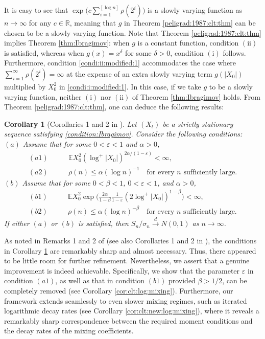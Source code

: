 \documentclass[11pt,a4,leqno]{amsart}
\newtheorem{corollary}[lemma]{Corollary}
\newcommand{\R}{\mathbb{R}}
\newcommand{\vep}{\varepsilon}
\newcommand{\E }{{\mathbb E}}
\newcommand{\1}{{\mathbf 1}}
\begin{document}
It is easy to see that $\exp\big(c\sum_{i=1}^{[\log n]}\rho(2^i)\big)$ is a slowly varying function as $n\to\infty$ 
for any $c\in \R$, meaning that $g$ in Theorem \ref{peligrad:1987:clt:thm} can be chosen to be a slowly varying function. 
Note that Theorem \ref{peligrad:1987:clt:thm} implies Theorem \ref{thm:Ibragimov}: when $g$ is a constant function, 
condition $(\mathrm{ii})$ is satisfied, whereas when $g(x)=x^\delta$ for some $\delta>0$, condition $(\mathrm{i})$ follows. 
Furthermore, condition \eqref{condi:ii:modified:1} accommodates the case where $\sum_{i=1}^\infty \rho(2^i)=\infty$ 
at the expense of an extra slowly varying term $g(|X_0|)$ multiplied by $X^2_0$ in \eqref{condi:i:modified:1}. 
In this case, if we take $g$ to be a slowly varying function, neither $(\mathrm{i})$ nor $(\mathrm{ii})$ 
of Theorem \ref{thm:Ibragimov} holds. From Theorem \ref{peligrad:1987:clt:thm}, one can deduce the following results:

\begin{corollary}[Corollaries 1 and 2 in \cite{peligrad:1987}]
\label{peligrad:1987:clt:cor12}
 Let $(X_t)$ be a strictly stationary sequence satisfying \eqref{condition:Ibragimov}. Consider the following conditions: \\
$(a)$ Assume that for some $0<\vep<1$ and $\alpha>0$, 
\begin{align*}
(a1) \qquad & \E X_0^2 (\log^+ |X_0|)^{2\alpha/(1-\vep)} <\infty, \\
(a2) \qquad & \rho(n) \le \alpha (\log n)^{-1} \quad \text{for every $n$ sufficiently large.}
\end{align*}
$(b)$ Assume that for some $0<\beta <1$, $0<\vep<1$, and $\alpha >0$, 
\begin{align*}
 (b1) \qquad & \E X_0^2 \exp\Big( \frac{2\alpha}{1-\beta}\frac{1}{1-\vep} (2\log^+|X_0|)^{1-\beta} \Big) <\infty, \\ 
 (b2) \qquad & \rho(n) \le \alpha (\log n)^{-\beta} \quad \text{for every $n$ sufficiently large.} 
\end{align*}
If either $(a)$ or $(b)$ is satisfied, then $S_n/\sigma_n\stackrel{d}{\to} N(0,1)$ as $n\to\infty$. 
\end{corollary}

As noted in Remarks 1 and 2 of \cite{peligrad:1987} (see also Corollaries 1 and 2 in \cite{bradley:1987}), 
the conditions in Corollary \ref{peligrad:1987:clt:cor12} are remarkably sharp and almost necessary. 
Thus, there appeared to be little room for further refinement. Nevertheless, we assert that a genuine 
improvement is indeed achievable. Specifically, we show that the parameter $\vep$ in condition $(a1)$, 
as well as that in condition $(b1)$ provided $\beta > 1/2$, can be completely removed (see Corollary \ref{cor:clt:log:mixing}). 
Furthermore, our framework extends seamlessly to even slower mixing regimes, such as iterated logarithmic decay rates 
(see Corollary \ref{cor:clt:new:log:mixing}), where it reveals a remarkably sharp correspondence between 
the required moment conditions and the decay rates of the mixing coefficients.
\end{document}
